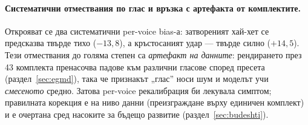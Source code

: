 \paragraph{Систематични отмествания по глас и връзка с артефакта от комплектите.}
Открояват се два систематични per-voice bias-а: затвореният хай-хет се предсказва
твърде тихо ($-13{,}8$), а кръстосаният удар — твърде силно ($+14{,}5$). Тези
отмествания до голяма степен са \emph{артефакт на данните}: рендирането през 43
комплекта пренасочва падове към различни гласове според пресета
(раздел~\ref{sec:egmd}), така че признакът „глас'' носи шум и моделът учи
\emph{смесеното} средно. Затова per-voice рекалибрация би лекувала симптом;
правилната корекция е на ниво данни (преизграждане върху единичен комплект) и е
очертана сред насоките за бъдещо развитие (раздел~\ref{sec:budeshti}).
